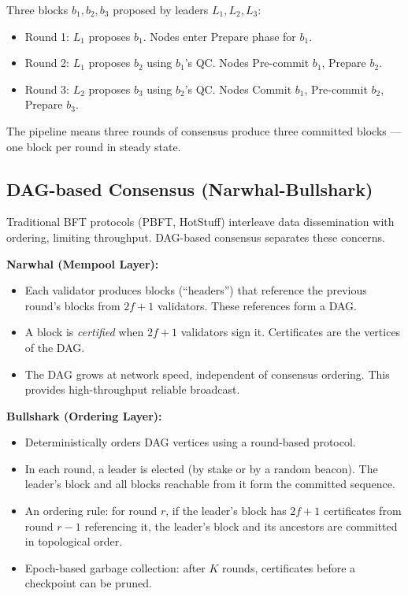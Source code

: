 \begin{example}
Three blocks $b_1, b_2, b_3$ proposed by leaders $L_1, L_2, L_3$:
\begin{itemize}
\item Round 1: $L_1$ proposes $b_1$. Nodes enter Prepare phase for $b_1$.
\item Round 2: $L_1$ proposes $b_2$ using $b_1$'s QC. Nodes Pre-commit $b_1$, Prepare $b_2$.
\item Round 3: $L_2$ proposes $b_3$ using $b_2$'s QC. Nodes Commit $b_1$, Pre-commit $b_2$, Prepare $b_3$.
\end{itemize}
The pipeline means three rounds of consensus produce three committed blocks — one block per round in steady state.
\end{example}

\subsection{DAG-based Consensus (Narwhal-Bullshark)}
\label{sec:consensus:dag}

Traditional BFT protocols (PBFT, HotStuff) interleave data dissemination with ordering, limiting throughput. DAG-based consensus separates these concerns.

\textbf{Narwhal (Mempool Layer):}
\begin{itemize}
\item Each validator produces blocks (``headers'') that reference the previous round's blocks from $2f+1$ validators. These references form a DAG.
\item A block is \emph{certified} when $2f+1$ validators sign it. Certificates are the vertices of the DAG.
\item The DAG grows at network speed, independent of consensus ordering. This provides high-throughput reliable broadcast.
\end{itemize}

\textbf{Bullshark (Ordering Layer):}
\begin{itemize}
\item Deterministically orders DAG vertices using a round-based protocol.
\item In each round, a leader is elected (by stake or by a random beacon). The leader's block and all blocks reachable from it form the committed sequence.
\item An ordering rule: for round $r$, if the leader's block has $2f+1$ certificates from round $r-1$ referencing it, the leader's block and its ancestors are committed in topological order.
\item Epoch-based garbage collection: after $K$ rounds, certificates before a checkpoint can be pruned.
\end{itemize}

